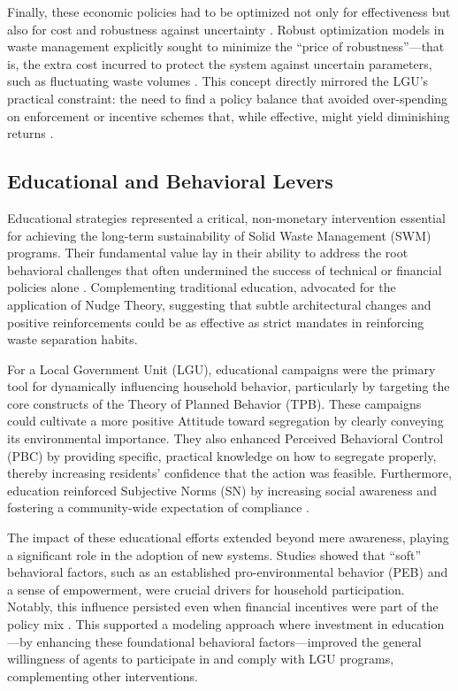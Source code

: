 Finally, these economic policies had to be optimized not only for effectiveness but also for cost and robustness against uncertainty \citep{Gentile2022}. Robust optimization models in waste management explicitly sought to minimize the ``price of robustness''—that is, the extra cost incurred to protect the system against uncertain parameters, such as fluctuating waste volumes \citep{Gentile2022}. This concept directly mirrored the LGU’s practical constraint: the need to find a policy balance that avoided over-spending on enforcement or incentive schemes that, while effective, might yield diminishing returns \citep{Gentile2022}.

\subsection{Educational and Behavioral Levers}
\setlength{\parindent}{2em}

Educational strategies represented a critical, non-monetary intervention essential for achieving the long-term sustainability of Solid Waste Management (SWM) programs. Their fundamental value lay in their ability to address the root behavioral challenges that often undermined the success of technical or financial policies alone \citep{Moeini2023}. Complementing traditional education, \citet{LoanBalanay2023} advocated for the application of Nudge Theory, suggesting that subtle architectural changes and positive reinforcements could be as effective as strict mandates in reinforcing waste separation habits.

For a Local Government Unit (LGU), educational campaigns were the primary tool for dynamically influencing household behavior, particularly by targeting the core constructs of the Theory of Planned Behavior (TPB). These campaigns could cultivate a more positive Attitude toward segregation by clearly conveying its environmental importance. They also enhanced Perceived Behavioral Control (PBC) by providing specific, practical knowledge on how to segregate properly, thereby increasing residents' confidence that the action was feasible. Furthermore, education reinforced Subjective Norms (SN) by increasing social awareness and fostering a community-wide expectation of compliance \citep{Vorobeva2022}.

The impact of these educational efforts extended beyond mere awareness, playing a significant role in the adoption of new systems. Studies showed that ``soft'' behavioral factors, such as an established pro-environmental behavior (PEB) and a sense of empowerment, were crucial drivers for household participation. Notably, this influence persisted even when financial incentives were part of the policy mix \citep{Vorobeva2022}. This supported a modeling approach where investment in education—by enhancing these foundational behavioral factors—improved the general willingness of agents to participate in and comply with LGU programs, complementing other interventions.

